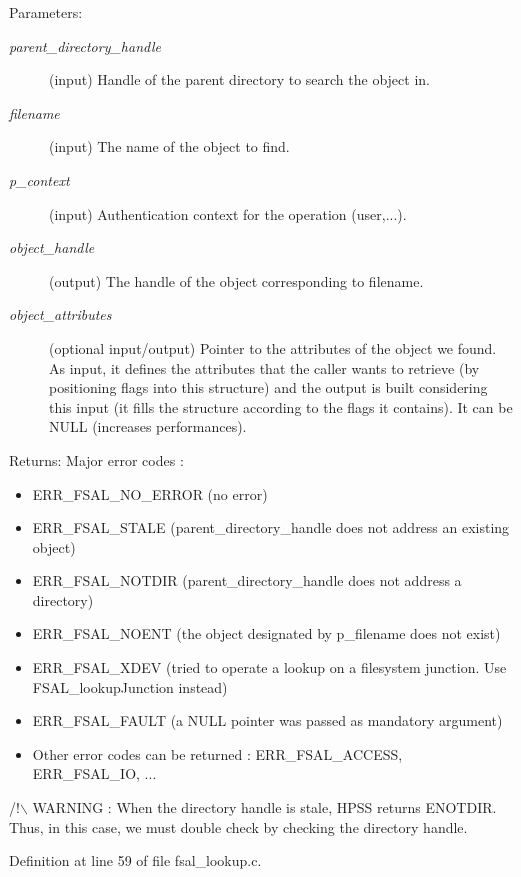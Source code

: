 \begin{Desc}
\item[Parameters:]
\begin{description}
\item[{\em parent\_\-directory\_\-handle}](input) Handle of the parent directory to search the object in. \item[{\em filename}](input) The name of the object to find. \item[{\em p\_\-context}](input) Authentication context for the operation (user,...). \item[{\em object\_\-handle}](output) The handle of the object corresponding to filename. \item[{\em object\_\-attributes}](optional input/output) Pointer to the attributes of the object we found. As input, it defines the attributes that the caller wants to retrieve (by positioning flags into this structure) and the output is built considering this input (it fills the structure according to the flags it contains). It can be NULL (increases performances).\end{description}
\end{Desc}
\begin{Desc}
\item[Returns:]Major error codes :\begin{itemize}
\item ERR\_\-FSAL\_\-NO\_\-ERROR (no error)\item ERR\_\-FSAL\_\-STALE (parent\_\-directory\_\-handle does not address an existing object)\item ERR\_\-FSAL\_\-NOTDIR (parent\_\-directory\_\-handle does not address a directory)\item ERR\_\-FSAL\_\-NOENT (the object designated by p\_\-filename does not exist)\item ERR\_\-FSAL\_\-XDEV (tried to operate a lookup on a filesystem junction. Use FSAL\_\-lookup\-Junction instead)\item ERR\_\-FSAL\_\-FAULT (a NULL pointer was passed as mandatory argument)\item Other error codes can be returned : ERR\_\-FSAL\_\-ACCESS, ERR\_\-FSAL\_\-IO, ...\end{itemize}
\end{Desc}


/!$\backslash$ WARNING : When the directory handle is stale, HPSS returns ENOTDIR. Thus, in this case, we must double check by checking the directory handle. 

Definition at line 59 of file fsal\_\-lookup.c.


